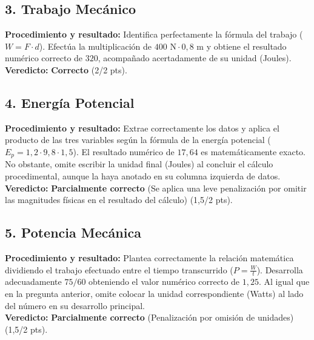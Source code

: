 \documentclass[12pt,letterpaper]{article}
\begin{document}
\subsection*{3. Trabajo Mecánico}
\textbf{Procedimiento y resultado:} Identifica perfectamente la fórmula del trabajo ($W = F \cdot d$). Efectúa la multiplicación de $400 \text{ N} \cdot 0,8 \text{ m}$ y obtiene el resultado numérico correcto de $320$, acompañado acertadamente de su unidad (Joules). \\
\textbf{Veredicto:} \textbf{Correcto} (2/2 pts).

\subsection*{4. Energía Potencial}
\textbf{Procedimiento y resultado:} Extrae correctamente los datos y aplica el producto de las tres variables según la fórmula de la energía potencial ($E_p = 1,2 \cdot 9,8 \cdot 1,5$). El resultado numérico de $17,64$ es matemáticamente exacto. No obstante, omite escribir la unidad final (Joules) al concluir el cálculo procedimental, aunque la haya anotado en su columna izquierda de datos. \\
\textbf{Veredicto:} \textbf{Parcialmente correcto} (Se aplica una leve penalización por omitir las magnitudes físicas en el resultado del cálculo) (1,5/2 pts).

\subsection*{5. Potencia Mecánica}
\textbf{Procedimiento y resultado:} Plantea correctamente la relación matemática dividiendo el trabajo efectuado entre el tiempo transcurrido ($P = \frac{W}{t}$). Desarrolla adecuadamente $75 / 60$ obteniendo el valor numérico correcto de $1,25$. Al igual que en la pregunta anterior, omite colocar la unidad correspondiente (Watts) al lado del número en su desarrollo principal. \\
\textbf{Veredicto:} \textbf{Parcialmente correcto} (Penalización por omisión de unidades) (1,5/2 pts).

\vspace{0.5cm}
\end{document}
